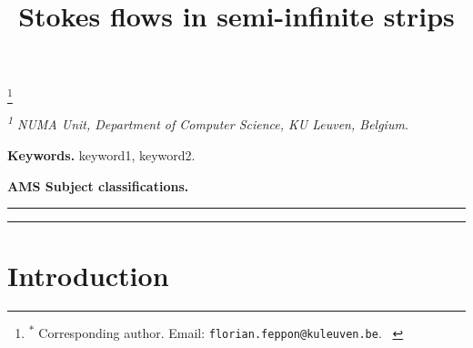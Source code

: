 \documentclass[a4paper,10pt,reqno]{amsart}
\begin{document}
\title{ Stokes flows in semi-infinite strips }
\author{}
\thanks{\hspace*{0.3em}\textsuperscript{$*$} Corresponding author. Email:
\texttt{florian.feppon@kuleuven.be}. \
\hspace*{\parindent}
}

\maketitle


\vspace{-2em}
\begin{center}
\emph{\textsuperscript{1} NUMA Unit, Department of Computer Science, KU Leuven,
    Belgium.}
\end{center}

\begin{abstract} 

\end{abstract} 
\medskip  
\noindent \textbf{Keywords.} keyword1, keyword2. 

\medskip
\noindent \textbf{AMS Subject classifications.}  \par
\medskip
\bigskip
\hrule
\tableofcontents
\vspace{-0.5cm}
\hrule
\medskip
\bigskip
\section{Introduction}





\end{document}
